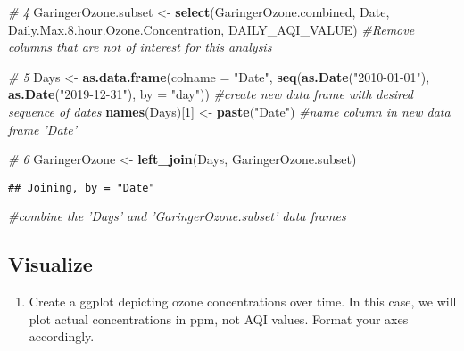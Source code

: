 \documentclass[
]{article}
\newenvironment{Shaded}{\begin{snugshade}}{\end{snugshade}}
\newcommand{\CommentTok}[1]{\textcolor[rgb]{0.56,0.35,0.01}{\textit{#1}}}
\newcommand{\DataTypeTok}[1]{\textcolor[rgb]{0.13,0.29,0.53}{#1}}
\newcommand{\DecValTok}[1]{\textcolor[rgb]{0.00,0.00,0.81}{#1}}
\newcommand{\FloatTok}[1]{\textcolor[rgb]{0.00,0.00,0.81}{#1}}
\newcommand{\KeywordTok}[1]{\textcolor[rgb]{0.13,0.29,0.53}{\textbf{#1}}}
\newcommand{\NormalTok}[1]{#1}
\newcommand{\StringTok}[1]{\textcolor[rgb]{0.31,0.60,0.02}{#1}}
\providecommand{\tightlist}{%
  \setlength{\itemsep}{0pt}\setlength{\parskip}{0pt}}
\begin{document}
\begin{Shaded}
\begin{Highlighting}[]
\CommentTok{# 4}
\NormalTok{GaringerOzone.subset <-}\StringTok{ }
\StringTok{  }\KeywordTok{select}\NormalTok{(GaringerOzone.combined, Date, Daily.Max.}\FloatTok{8.}\NormalTok{hour.Ozone.Concentration,}
\NormalTok{          DAILY_AQI_VALUE)}
  \CommentTok{#Remove columns that are not of interest for this analysis}

\CommentTok{# 5}
\NormalTok{Days <-}
\StringTok{  }\KeywordTok{as.data.frame}\NormalTok{(}\DataTypeTok{colname =} \StringTok{"Date"}\NormalTok{, }\KeywordTok{seq}\NormalTok{(}\KeywordTok{as.Date}\NormalTok{(}\StringTok{"2010-01-01"}\NormalTok{), }
                                      \KeywordTok{as.Date}\NormalTok{(}\StringTok{"2019-12-31"}\NormalTok{), }\DataTypeTok{by =} \StringTok{"day"}\NormalTok{))}
  \CommentTok{#create new data frame with desired sequence of dates}
\KeywordTok{names}\NormalTok{(Days)[}\DecValTok{1}\NormalTok{] <-}\StringTok{ }\KeywordTok{paste}\NormalTok{(}\StringTok{"Date"}\NormalTok{)}
  \CommentTok{#name column in new data frame 'Date'}


\CommentTok{# 6}
\NormalTok{GaringerOzone <-}\StringTok{ }
\StringTok{  }\KeywordTok{left_join}\NormalTok{(Days, GaringerOzone.subset)}
\end{Highlighting}
\end{Shaded}

\begin{verbatim}
## Joining, by = "Date"
\end{verbatim}

\begin{Shaded}
\begin{Highlighting}[]
  \CommentTok{#combine the 'Days' and 'GaringerOzone.subset' data frames}
\end{Highlighting}
\end{Shaded}

\hypertarget{visualize}{%
\subsection{Visualize}\label{visualize}}

\begin{enumerate}
\def\labelenumi{\arabic{enumi}.}
\setcounter{enumi}{6}
\tightlist
\item
  Create a ggplot depicting ozone concentrations over time. In this
  case, we will plot actual concentrations in ppm, not AQI values.
  Format your axes accordingly.
\end{enumerate}
\end{document}
